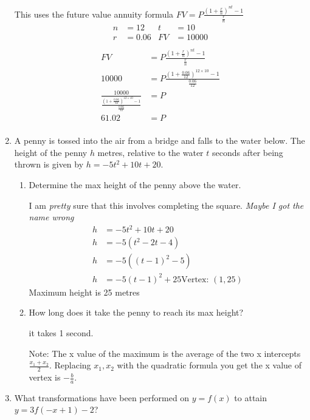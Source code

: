 \documentclass[paper=a4, fontsize=11pt]{scrartcl}
\begin{document}
\begin{enumerate}[resume]
    This uses the future value annuity formula $FV=P\frac{(1+\frac{r}{n})^{nt}-1}{\frac{r}{n}}$ 
    \begin{align*}
        n&=12&t&=10\\
        r&=0.06&FV&=10000\\
    \end{align*}
    \begin{align*}
        FV&=P\frac{(1+\frac{r}{n})^{nt}-1}{\frac{r}{n}}\\
        10000&=P\frac{(1+\frac{0.06}{12})^{12\times 10}-1}{\frac{0.06}{12}}\\
        \frac{10000}{\frac{(1+\frac{0.06}{12})^{12\times 10}-1}{\frac{0.06}{12}}}&=P\\
        61.02&=P\\
    \end{align*}
    \item A penny is tossed into the air from a bridge and falls to the water below. The height of the penny $h$ metres, relative to the water $t$ seconds after being thrown is given by $h=-5t^2+10t+20$.
        \begin{enumerate}
            \item Determine the max height of the penny above the water.
            
            I am \textit{pretty }sure that this involves completing the square. \textit{Maybe I got the name wrong}
            \begin{align*}
                h&=-5t^2+10t+20\\
                h&=-5(t^2-2t-4)\\
                h&=-5((t-1)^2-5)\\
                h&=-5(t-1)^2+25
                \text{Vertex: }(1,25)
            \end{align*}
            Maximum height is 25 metres
            \item How long does it take the penny to reach its max height?
            
            it takes 1 second.

            Note: The x value of the maximum is the average of the two x intercepts $\frac{x_1+x_2}{2}$.
            Replacing $x_1,x_2$ with the quadratic formula you get the x value of vertex is $-\frac{b}{a}$.
        \end{enumerate}
        \item What transformations have been performed on $y=f(x)$ to attain $y=3f(-x+1)-2$?
        

\end{enumerate}
\end{document}
